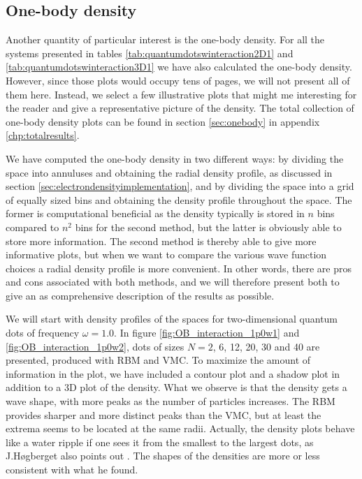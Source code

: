 \subsection{One-body density}
Another quantity of particular interest is the one-body density. For all the systems presented in tables \eqref{tab:quantumdotswinteraction2D1} and \eqref{tab:quantumdotswinteraction3D1} we have also calculated the one-body density. However, since those plots would occupy tens of pages, we will not present all of them here. Instead, we select a few illustrative plots that might me interesting for the reader and give a representative picture of the density. The total collection of one-body density plots can be found in section \ref{sec:onebody} in appendix \ref{chp:totalresults}. 

We have computed the one-body density in two different ways: by dividing the space into annuluses and obtaining the radial density profile, as discussed in section \ref{sec:electrondensityimplementation}, and by dividing the space into a grid of equally sized bins and obtaining the density profile throughout the space. The former is computational beneficial as the density typically is stored in $n$ bins compared to $n^2$ bins for the second method, but the latter is obviously able to store more information. The second method is thereby able to give more informative plots, but when we want to compare the various wave function choices a radial density profile is more convenient. In other words, there are pros and cons associated with both methods, and we will therefore present both to give an as comprehensive description of the results as possible. 

We will start with density profiles of the spaces for two-dimensional quantum dots of frequency $\omega=1.0$. In figure \eqref{fig:OB_interaction_1p0w1} and \eqref{fig:OB_interaction_1p0w2}, dots of sizes $N=2$, 6, 12, 20, 30 and 40 are presented, produced with RBM and VMC. To maximize the amount of information in the plot, we have included a contour plot and a shadow plot in addition to a 3D plot of the density. What we observe is that the density gets a wave shape, with more peaks as the number of particles increases. The RBM provides sharper and more distinct peaks than the VMC, but at least the extrema seems to be located at the same radii.  Actually, the density plots behave like a water ripple if one sees it from the smallest to the largest dots, as J.Høgberget also points out \cite{hogberget_quantum_2013}. The shapes of the densities are more or less consistent with what he found. 

